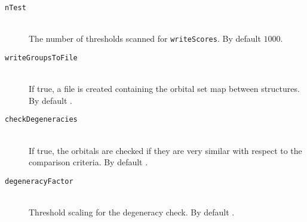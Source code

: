 \begin{description}
    \item [\texttt{nTest}]\hfill \\
    The number of thresholds scanned for \texttt{writeScores}. By default $1000$.
    \item [\texttt{writeGroupsToFile}]\hfill \\
    If true, a file is created containing the orbital set map between structures. By default .
    \item [\texttt{checkDegeneracies}]\hfill \\
    If true, the orbitals are checked if they are very similar with respect to the comparison criteria. By default .
    \item [\texttt{degeneracyFactor}]\hfill \\
    Threshold scaling for the degeneracy check. By default .
 \end{description}
